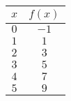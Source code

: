 \begin{tabular}{cc} \toprule
$x$  & $f(x)$ \\\midrule
$0$  & $-1$   \\[6pt]
$1$  & $1$    \\[6pt]
$2$  & $3$    \\[6pt]
$3$  & $5$    \\[6pt]
$4$  & $7$    \\[6pt]
$5$  & $9$    \\\bottomrule
\end{tabular}

